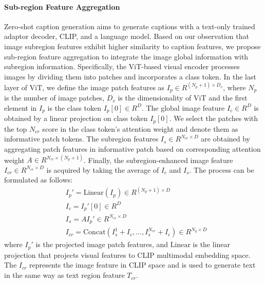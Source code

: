 \paragraph{\textbf{Sub-region Feature Aggregation}} 
\label{method:subregion}
Zero-shot caption generation aims to generate captions with a text-only trained adaptor decoder, CLIP, and a language model. Based on our observation that image subregion features exhibit higher similarity to caption features, we propose sub-region feature aggregation to integrate the image global information with subregion information.
Specifically, the ViT-based visual encoder processes images by dividing them into patches and incorporates a class token. In the last layer of ViT, we define the image patch features as $I_{p} \in R^{(N_p + 1) \times D_v}$, where $N_p$ is the number of image patches, $D_v$ is the dimensionality of ViT and the first element in $I_{p}$ is the class token $I_{p}[0]  \in R^{D}$. 
The global image feature $I_{c} \in R^{D}$ is obtained by a linear projection on class token $I_{p}[0]$. We select the patches with the top $N_{cr}$ score in the class token's attention weight and denote them as informative patch tokens. The subregion features $I_{s} \in R^{N_{cr} \times D} $ are obtained by aggregating patch features in informative patch based on corresponding attention weight $A \in R^{N_{cr} \times (N_p + 1)}$. Finally, the subregion-enhanced image feature $I_{cr} \in R^{N_{cr} \times D}$ is acquired by taking the average of $I_{c}$ and $I_{s}$. The process can be formulated as follows:
\begin{align}
    &I_{p}' = \mathrm{Linear}(I_{p}) \in R^{(N_p + 1) \times D}  \\
    &I_{c} =  I_{p}'[0] \in R^{D} \\
    &I_{s} = A  I_{p}' \in R^{N_{cr} \times D} \\
    &I_{cr} = \mathrm{Concat}(I_{s}^1 + I_{c}, \dots, I_{s}^{N_{cr}} + I_{c})  \in R^{N_{q} \times D}
\end{align}
where $I_{p}'$ is the projected image patch features, and $\mathrm{Linear}$ is the linear projection that projects visual features to CLIP multimodal embedding space. The $I_{cr}$ represents the image feature in CLIP space and is used to generate text in the same way as text region feature $T_{cr}$. 


